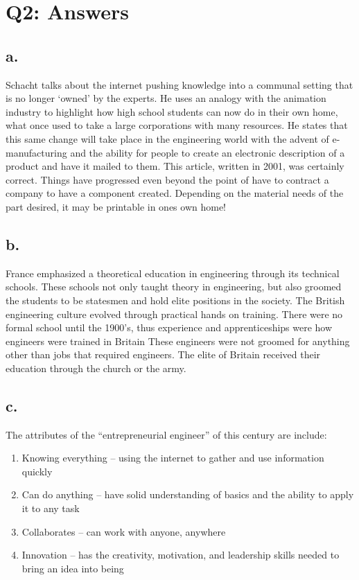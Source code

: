 \documentclass[12pt]{article}
\renewcommand{\=}[1]{\stackrel{#1}{=}} %
\theoremstyle{definition}
\theoremstyle{remark}
\begin{document}
\section{Q2: Answers}

\subsection{a.}
Schacht talks about the internet pushing knowledge into a communal setting that is no longer ‘owned’ by the experts. He uses an analogy with the animation industry to highlight how high school students can now do in their own home, what once used to take a large corporations with many resources. He states that this same change will take place in the engineering world with the advent of e-manufacturing and the ability for people to create an electronic description of a product and have it mailed to them. This article, written in 2001, was certainly correct. Things have progressed even beyond the point of have to contract a company to have a component created. Depending on the material needs of the part desired, it may be printable in ones own home!

\subsection{b.}
France emphasized a theoretical education in engineering through its technical schools. These schools not only taught theory in engineering, but also groomed the students to be statesmen and hold elite positions in the society. The British engineering culture evolved through practical hands on training. There were no formal school until the 1900's, thus experience and apprenticeships were how engineers were trained in Britain These engineers were not groomed for anything other than jobs that required engineers. The elite of Britain received their education through the church or the army. 

\subsection{c.}
The attributes of the “entrepreneurial engineer” of this century are include:
\begin{enumerate}
	\item Knowing everything – using the internet to gather and use information quickly
	\item Can do anything – have solid understanding of basics and the ability to apply it to any task
	\item Collaborates – can work with anyone, anywhere
	\item Innovation – has the creativity, motivation, and leadership skills needed to bring an idea into being
\end{enumerate}
\end{document}
